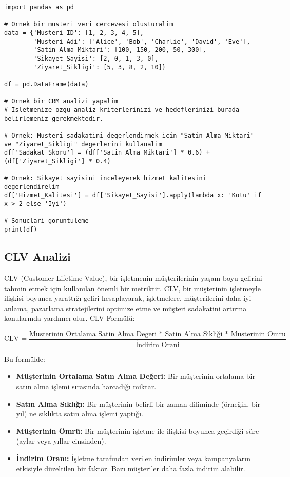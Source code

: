 \begin{lstlisting}
import pandas as pd

# Ornek bir musteri veri cercevesi olusturalim
data = {'Musteri_ID': [1, 2, 3, 4, 5],
        'Musteri_Adi': ['Alice', 'Bob', 'Charlie', 'David', 'Eve'],
        'Satin_Alma_Miktari': [100, 150, 200, 50, 300],
        'Sikayet_Sayisi': [2, 0, 1, 3, 0],
        'Ziyaret_Sikligi': [5, 3, 8, 2, 10]}

df = pd.DataFrame(data)

# Ornek bir CRM analizi yapalim
# Isletmenize ozgu analiz kriterlerinizi ve hedeflerinizi burada belirlemeniz gerekmektedir.

# Ornek: Musteri sadakatini degerlendirmek icin "Satin_Alma_Miktari" ve "Ziyaret_Sikligi" degerlerini kullanalim
df['Sadakat_Skoru'] = (df['Satin_Alma_Miktari'] * 0.6) + (df['Ziyaret_Sikligi'] * 0.4)

# Ornek: Sikayet sayisini inceleyerek hizmet kalitesini degerlendirelim
df['Hizmet_Kalitesi'] = df['Sikayet_Sayisi'].apply(lambda x: 'Kotu' if x > 2 else 'Iyi')

# Sonuclari goruntuleme
print(df)
\end{lstlisting}

\subsection{CLV Analizi}
CLV (Customer Lifetime Value), bir işletmenin müşterilerinin yaşam boyu gelirini tahmin etmek için kullanılan önemli bir metriktir. CLV, bir müşterinin işletmeyle ilişkisi boyunca yarattığı geliri hesaplayarak, işletmelere, müşterilerini daha iyi anlama, pazarlama stratejilerini optimize etme ve müşteri sadakatini artırma konularında yardımcı olur. CLV Formülü:

\[\text{CLV} = \frac{\text{Musterinin Ortalama Satin Alma Degeri * Satin Alma Sikliği * Musterinin Omru}}{\text{İndirim Orani}}\]

Bu formülde:
\begin{itemize}
    \item \textbf{Müşterinin Ortalama Satın Alma Değeri:} Bir müşterinin ortalama bir satın alma işlemi sırasında harcadığı miktar.
    \item \textbf{Satın Alma Sıklığı:} Bir müşterinin belirli bir zaman diliminde (örneğin, bir yıl) ne sıklıkta satın alma işlemi yaptığı.
    \item \textbf{Müşterinin Ömrü:} Bir müşterinin işletme ile ilişkisi boyunca geçirdiği süre (aylar veya yıllar cinsinden).
    \item \textbf{İndirim Oranı:} İşletme tarafından verilen indirimler veya kampanyaların etkisiyle düzeltilen bir faktör. Bazı müşteriler daha fazla indirim alabilir.
\end{itemize}

